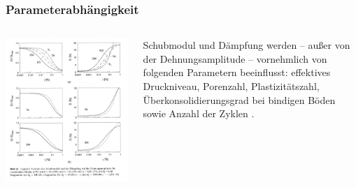\begin{frame}
\frametitle{Parameterabhängigkeit}
\begin{columns}
\begin{column}[t]{.475\linewidth}
\includegraphics[width=\linewidth]{fig_img/bild16.jpg}
\end{column}
\begin{column}[t]{.525\linewidth}
\vspace{-5cm}

Schubmodul und Dämpfung werden -- außer von der Dehnungsamplitude -- vornehmlich von folgenden Parametern beeinflusst: effektives Druckniveau, Porenzahl, Plastizitätszahl, Überkonsolidierungsgrad bei bindigen Böden sowie Anzahl der Zyklen \cite{Vrettos2017}.
\end{column}
\end{columns}
\end{frame}

